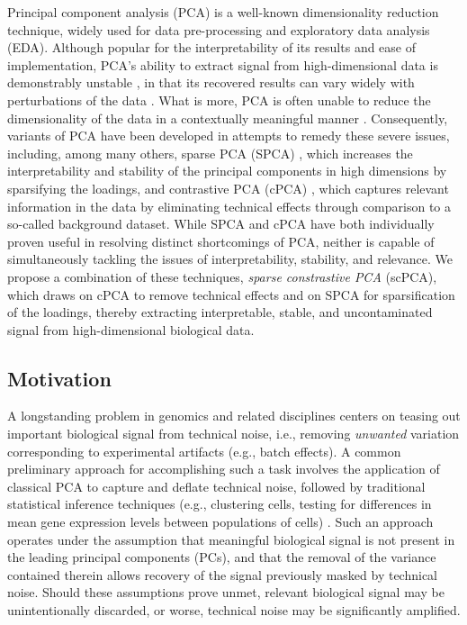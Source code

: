 Principal component analysis (PCA) is a well-known dimensionality reduction technique, widely used for data pre-processing and exploratory data analysis (EDA). Although popular for the interpretability of its results and ease of implementation, PCA's ability to extract signal from high-dimensional data is demonstrably unstable \citep{Shen2013,Johnstone2009}, in that its recovered results can vary widely with perturbations of the data \citep{yu2013}. What is more, PCA is often unable to reduce the dimensionality of the data in a contextually meaningful manner \citep{ringner2008,Abid2018}. Consequently, variants of PCA have been developed in attempts to remedy these severe issues, including, among many others, sparse PCA (SPCA) \citep{Zou2006}, which increases the interpretability and stability of the principal components in high dimensions by sparsifying the loadings, and contrastive PCA (cPCA) \citep{Abid2018}, which captures relevant information in the data by eliminating technical effects through comparison to a so-called background dataset. While SPCA and cPCA have both individually proven useful in resolving distinct shortcomings of PCA, neither is capable of simultaneously tackling the issues of interpretability, stability, and relevance. We propose a combination of these techniques, \textit{sparse constrastive PCA} (scPCA), which draws on cPCA to remove technical effects and on SPCA for sparsification of the loadings, thereby extracting interpretable, stable, and uncontaminated signal from high-dimensional biological data.

\subsection{Motivation}

A longstanding problem in genomics and related disciplines centers on teasing out important biological signal from technical noise, i.e., removing \textit{unwanted} variation corresponding to experimental artifacts (e.g., batch effects). A common preliminary approach for accomplishing such a task involves the application of classical PCA to capture and deflate technical noise, followed by traditional statistical inference techniques (e.g., clustering cells, testing for differences in mean gene expression levels between populations of cells) \citep{Nguyen2019}. Such an approach operates under the assumption that meaningful biological signal is not present in the leading principal components (PCs), and that the removal of the variance contained therein allows recovery of the signal previously masked by technical noise. Should these assumptions prove unmet, relevant biological signal may be unintentionally discarded, or worse, technical noise may be significantly amplified.

